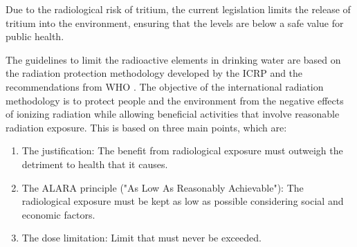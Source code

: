 Due to the radiological risk of tritium, the current legislation limits the release of tritium into the environment, ensuring that the levels are below a safe value for public health.

The guidelines to limit the radioactive elements in drinking water are based on the radiation protection methodology developed by the ICRP \cite{ICRP_GL} and the recommendations from WHO \cite{WHO_GL}. The objective of the international radiation methodology is to  protect people and the environment from the negative effects of ionizing radiation while allowing beneficial activities that involve reasonable radiation exposure. This is based on three main points, which are:
\begin{enumerate}
\item{} The justification: The benefit from radiological exposure must outweigh the detriment to health that it causes.
\item{} The ALARA principle ("As Low As Reasonably Achievable"): The radiological exposure must be kept as low as possible considering social and economic factors.
\item{} The dose limitation: Limit that must never be exceeded.
\end{enumerate}

